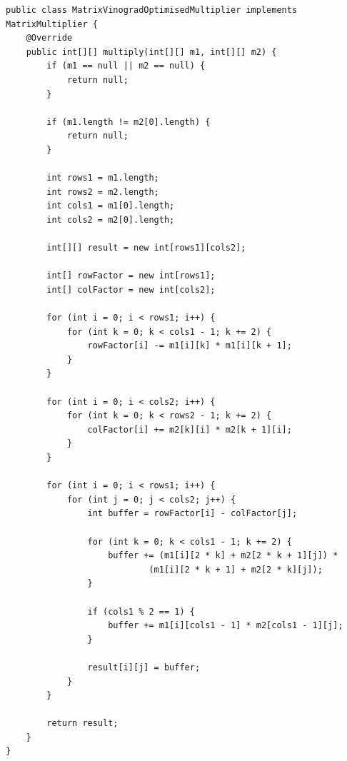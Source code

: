\documentclass[12pt]{report}
\begin{document}
    \begin{lstlisting}[caption=Оптимизированный алгоритм Копперсмита-Винограда, label={lst:optVinograd}, justification=RaggedRight]
public class MatrixVinogradOptimisedMultiplier implements MatrixMultiplier {
    @Override
    public int[][] multiply(int[][] m1, int[][] m2) {
        if (m1 == null || m2 == null) {
            return null;
        }

        if (m1.length != m2[0].length) {
            return null;
        }

        int rows1 = m1.length;
        int rows2 = m2.length;
        int cols1 = m1[0].length;
        int cols2 = m2[0].length;

        int[][] result = new int[rows1][cols2];

        int[] rowFactor = new int[rows1];
        int[] colFactor = new int[cols2];

        for (int i = 0; i < rows1; i++) {
            for (int k = 0; k < cols1 - 1; k += 2) {
                rowFactor[i] -= m1[i][k] * m1[i][k + 1];
            }
        }

        for (int i = 0; i < cols2; i++) {
            for (int k = 0; k < rows2 - 1; k += 2) {
                colFactor[i] += m2[k][i] * m2[k + 1][i];
            }
        }

        for (int i = 0; i < rows1; i++) {
            for (int j = 0; j < cols2; j++) {
                int buffer = rowFactor[i] - colFactor[j];

                for (int k = 0; k < cols1 - 1; k += 2) {
                    buffer += (m1[i][2 * k] + m2[2 * k + 1][j]) *
                            (m1[i][2 * k + 1] + m2[2 * k][j]);
                }

                if (cols1 % 2 == 1) {
                    buffer += m1[i][cols1 - 1] * m2[cols1 - 1][j];
                }

                result[i][j] = buffer;
            }
        }

        return result;
    }
}
    \end{lstlisting}
\end{document}
